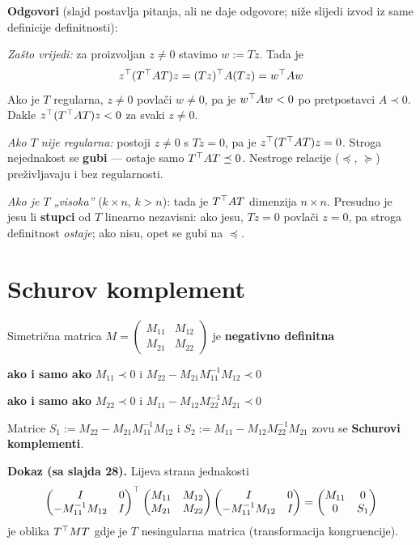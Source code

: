 \textbf{Odgovori} (slajd postavlja pitanja, ali ne daje odgovore; niže slijedi
izvod iz same definicije definitnosti):

\emph{Zašto vrijedi:} za proizvoljan $z \ne 0$ stavimo $w := Tz$. Tada je
\[
z^{\top}(T^{\top} AT)z = (Tz)^{\top} A(Tz) = w^{\top} Aw
\]
Ako je $T$ regularna, $z \ne 0$ povlači $w \ne 0$, pa je $w^{\top} Aw < 0$ po
pretpostavci $A \prec 0$. Dakle $z^{\top}(T^{\top} AT)z < 0$ za svaki $z \ne 0$.
\checkmark

\emph{Ako $T$ nije regularna:} postoji $z \ne 0$ s $Tz = 0$, pa je
$z^{\top}(T^{\top} AT)z = 0$. Stroga nejednakost se \textbf{gubi} --- ostaje samo
$T^{\top} AT \preceq 0$. Nestroge relacije ($\preceq$, $\succeq$) preživljavaju i
bez regularnosti.

\emph{Ako je $T$ „visoka”} ($k \times n$, $k > n$): tada je $T^{\top} AT$ dimenzija
$n \times n$. Presudno je jesu li \textbf{stupci} od $T$ linearno nezavisni:
ako jesu, $Tz = 0$ povlači $z = 0$, pa stroga definitnost \emph{ostaje}; ako
nisu, opet se gubi na $\preceq$.

\section{Schurov komplement}
\label{sec:schur}

\begin{teorem}
Simetrična matrica
$M = \begin{pmatrix} M_{11} & M_{12} \\ M_{21} & M_{22}\end{pmatrix}$
je \textbf{negativno definitna}

\medskip
\textbf{ako i samo ako}\quad
$M_{11} \prec 0$ \quad i \quad $M_{22} - M_{21}M_{11}^{-1}M_{12} \prec 0$

\medskip
\textbf{ako i samo ako}\quad
$M_{22} \prec 0$ \quad i \quad $M_{11} - M_{12}M_{22}^{-1}M_{21} \prec 0$

\medskip
Matrice $S_1 := M_{22} - M_{21}M_{11}^{-1}M_{12}$ i
$S_2 := M_{11} - M_{12}M_{22}^{-1}M_{21}$ zovu se \textbf{Schurovi
komplementi}.
\end{teorem}

\textbf{Dokaz (sa slajda 28).} Lijeva strana jednakosti
\[
\begin{pmatrix} I & 0 \\ -M_{11}^{-1}M_{12} & I \end{pmatrix}^{\top}
\begin{pmatrix} M_{11} & M_{12} \\ M_{21} & M_{22} \end{pmatrix}
\begin{pmatrix} I & 0 \\ -M_{11}^{-1}M_{12} & I \end{pmatrix}
= \begin{pmatrix} M_{11} & 0 \\ 0 & S_1 \end{pmatrix}
\]
je oblika $T^{\top} MT$ gdje je $T$ nesingularna matrica (transformacija
kongruencije).

